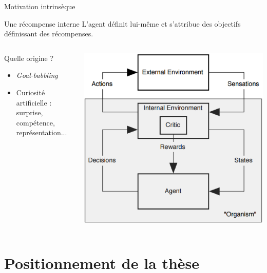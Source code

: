 \documentclass[xcolor=pst,dvips,12pt,english,french]{beamer}
\begin{document}
	\begin{frame}{Motivation intrinsèque}
		\begin{block}{Une récompense interne}
			L'agent définit lui-même et s'attribue des objectifs définissant des récompenses.
		\end{block}
		\begin{columns}
			\begin{column}{0.5\textwidth}
				\begin{exampleblock}{Quelle origine ?}
					\begin{itemize}
						\item \emph{Goal-babbling}
						\item Curiosité artificielle : surprise, compétence, représentation...
					\end{itemize}
				\end{exampleblock}
			\end{column}
			\begin{column}{0.35\textwidth}
				\includegraphics[width=\textwidth]{images/modele_imrl.eps}
			\end{column}
		\end{columns}
	\end{frame}
	
	\section{Positionnement de la thèse}
\end{document}
